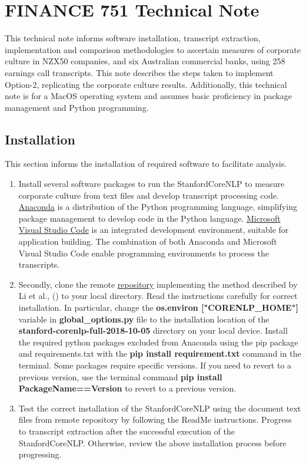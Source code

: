 \documentclass[11pt]{article}
\begin{document}
\section{FINANCE 751 Technical Note}
This technical note informs software installation, transcript extraction, implementation and comparison methodologies to ascertain measures of corporate culture in NZX50 companies, and six Australian commercial banks, using 258 earnings call transcripts. 
This note describes the steps taken to implement Option-2, replicating the corporate culture results.
Additionally, this technical note is for a MacOS operating system and assumes basic proficiency in package management and Python programming. 
\subsection{Installation}
This section informs the installation of required software to facilitate analysis.
\begin{enumerate}
    \item Install several software packages to run the StanfordCoreNLP to measure corporate culture from text files and develop transcript processing code. 
    \hyperlink{https://www.anaconda.com/}{Anaconda} is a distribution of the Python programming language, simplifying package management to develop code in the Python language.
    \hyperlink{https://code.visualstudio.com/}{Microsoft Visual Studio Code} is an integrated development environment, suitable for application building.
    The combination of both Anaconda and Microsoft Visual Studio Code enable programming environments to process the transcripts.
    \item Secondly, clone the remote \hyperlink{https://github.com/MS20190155/Measuring-Corporate-Culture-Using-Machine-Learning}{repository} implementing the method described by Li et al., (\citeyear{li2021measuring}) to your local directory.
    Read the instructions carefully for correct installation.
    In particular, change the \textbf{os.environ ["CORENLP\_HOME"]} variable in \textbf{global\_options.py} file to the installation location of the \textbf{stanford-corenlp-full-2018-10-05} directory on your local device.
    Install the required python packages excluded from Anaconda using the pip package and requirements.txt with the \textbf{pip install requirement.txt} command in the terminal.
    Some packages require specific versions. If you need to revert to a previous version, use the terminal command \textbf{pip install PackageName==Version} to revert to a previous version.
    \item Test the correct installation of the StanfordCoreNLP using the document text files from remote repository by following the ReadMe instructions. 
    Progress to transcript extraction after the successful execution of the StanfordCoreNLP. Otherwise, review the above installation process before progressing.
\end{enumerate} 
\end{document}
